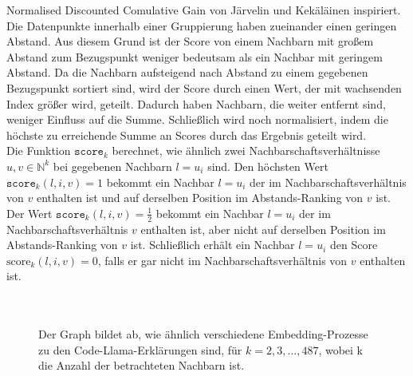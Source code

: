\documentclass[12pt,letterpaper,ngerman]{article}
\begin{document}
Normalised Discounted Comulative Gain von Järvelin und Kekäläinen
inspiriert\cite{ndcg}.\\
Die Datenpunkte innerhalb einer Gruppierung haben zueinander einen
geringen Abstand. Aus diesem Grund ist der Score von einem
Nachbarn mit großem Abstand zum Bezugspunkt weniger bedeutsam als 
ein Nachbar mit geringem Abstand. Da die Nachbarn aufsteigend nach
Abstand zu einem gegebenen Bezugspunkt sortiert sind, wird der 
Score durch einen Wert, der mit wachsenden Index größer wird, geteilt.
Dadurch haben Nachbarn, die weiter entfernt sind, weniger Einfluss
auf die Summe. Schließlich wird noch
normalisiert, indem die höchste zu erreichende Summe an Scores
durch das Ergebnis geteilt wird. \\
Die Funktion $\texttt{score}_k$ berechnet, wie ähnlich zwei 
Nachbarschaftsverhältnisse $u, v \in \mathbb{N}^k$ bei  gegebenen
Nachbarn $l = u_i$ sind. Den  höchsten Wert 
$\texttt{score}_k(l, i, v) = 1$
bekommt ein Nachbar $l = u_i$ der im Nachbarschaftsverhältnis von $v$
enthalten ist und auf derselben Position im Abstands-Ranking von $v$
ist. 
Der Wert $\texttt{score}_k(l, i, v) = \frac{1}{2}$ bekommt ein Nachbar
$l = u_i$ der im Nachbarschaftsverhältnis $v$ enthalten ist, aber nicht auf
derselben Position im Abstands-Ranking von $v$ ist. Schließlich erhält ein 
Nachbar $l = u_i$ den Score $\text{score}_k(l, i, v) = 0$, falls er gar nicht
im Nachbarschaftsverhältnis von $v$ enthalten ist.\\
\hfill\\
\pagebreak
\hfill\\
\begin{figure}
  \begin{center}
  \end{center}
  \caption{
    Der Graph bildet ab, wie ähnlich verschiedene Embedding-Prozesse
    zu den Code-Llama-Erklärungen sind, für $k=2,3, \dots ,487 $, wobei
    k die Anzahl der betrachteten Nachbarn ist.
  }
\end{figure}\\
\end{document}
